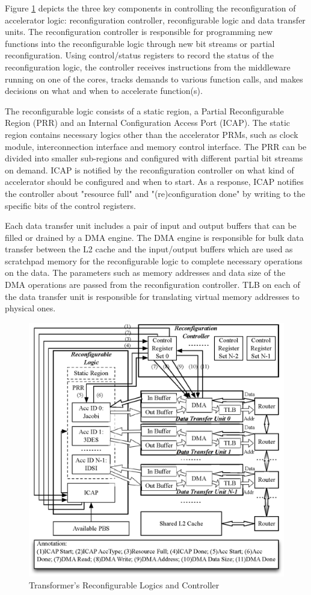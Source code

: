 Figure \ref{fig_reconfig_controller} depicts the three key components
in controlling the reconfiguration of accelerator logic:
reconfiguration controller, reconfigurable logic and data transfer
units. The reconfiguration controller is responsible for programming
new functions into the reconfigurable logic through new bit streams or
partial reconfiguration. Using control/status registers to record the
status of the reconfiguration logic, the controller receives
instructions from the middleware running on one of the cores, tracks
demands to various function calls, and makes decisions on what and
when to accelerate function(s).

The reconfigurable logic consists of a static region, a Partial
Reconfigurable Region (PRR) and an Internal Configuration Access Port
(ICAP). The static region contains necessary logics other than the
accelerator PRMs, such as clock module, interconnection interface and
memory control interface. The PRR can be divided into smaller
sub-regions and configured with different partial bit streams on
demand. ICAP is notified by the reconfiguration controller on what
kind of accelerator 
should be configured and when to start. As a response, ICAP notifies
the controller about "resource full" and "(re)configuration done" by
writing to the specific bits of the control registers.

Each data transfer unit includes a pair of input and output buffers
that can be filled or drained by a DMA engine. The DMA engine is
responsible for bulk data transfer between the L2 cache and the
input/output buffers which are used as scratchpad memory for the
reconfigurable logic to complete necessary operations on the data. The
parameters such as memory addresses and data size of the DMA
operations are passed from the reconfiguration controller. TLB on each
of the data transfer unit is responsible for translating virtual
memory addresses to physical ones.


\begin{figure}
    \centering
    \includegraphics[width=4.0 in]{HPCA14-Controller}
    \caption{Transformer's Reconfigurable Logics and Controller}
    \label{fig_reconfig_controller}
\vspace{-0.05in}
\end{figure}


